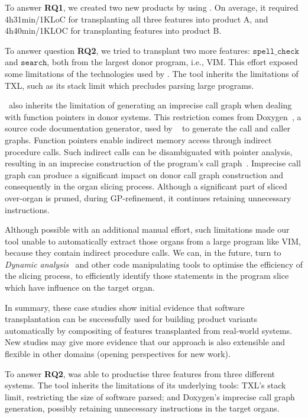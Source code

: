 \begin{framed}
\noindent To answer \textbf{RQ1}, we created two new products by using \autoscalpel. On average, it required 4h31min/1KLoC for transplanting all three features into product A, and 4h40min/1KLOC for transplanting features into product B.
\end{framed}

To answer question \textbf{RQ2}, we tried to transplant two more features:  $\texttt{spell\_check}$ and $\texttt{search}$, both from the largest donor program, i.e., VIM. This effort exposed some limitations of the technologies used by \autoscalpel. The tool inherits the limitations of TXL, such as its stack limit which precludes parsing large programs.

\autoscalpel~also inherits the limitation of generating an imprecise call graph when dealing with function pointers in donor systems. This restriction comes from Doxygen~\cite{Doxygen2018}, a source code documentation generator, used by \autoscalpel~ to generate the call and caller graphs. Function pointers enable indirect memory access through indirect procedure calls. Such indirect calls can be disambiguated with pointer analysis, resulting in an imprecise construction of the program's call graph~\cite{Milanova2004}.  Imprecise call graph can produce a significant impact on donor call graph construction and consequently in the organ slicing process. Although a significant part of sliced over-organ is pruned, during GP-refinement, it continues retaining unnecessary instructions.

Although possible with an additional manual effort, such limitations made our tool unable to automatically extract those organs from a large program like VIM, because they contain indirect procedure calls. We can, in the future, turn to \emph{Dynamic analysis}~\cite{Cornelissen2009} and other code manipulating tools to optimise the efficiency of the slicing process, to efficiently identify those statements in the program slice which have influence on the target organ. 

In summary, these case studies show initial evidence that software transplantation can be successfully used for building product variants automatically by compositing of features transplanted from real-world systems. New studies may give more evidence that our approach is also extensible and flexible in other domains (opening perspectives for new work).

\begin{framed}
\noindent To answer \textbf{RQ2}, \autoscalpel was able to productise three features from three different systems. The tool inherits the limitations of its underlying tools: TXL's stack limit, restricting the size of software parsed; and Doxygen's imprecise call graph generation, possibly retaining unnecessary instructions in the target organs.
\end{framed}